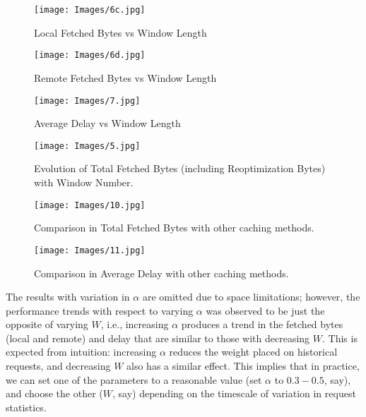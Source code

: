 \documentclass[conference]{IEEEtran}
\begin{document}
\begin{figure*}
\begin{minipage}[t]{0.32\textwidth}
  \texttt{[image: Images/6c.jpg]}
  \vspace{-0.6cm}
  \caption{Local Fetched Bytes vs Window Length}
  \label{fig:window:first}
\end{minipage}%
\hfill %
\begin{minipage}[t]{0.32\textwidth}
  \texttt{[image: Images/6d.jpg]}
  \vspace{-0.6cm}
  \caption{Remote Fetched Bytes vs Window Length}
  \label{fig:window:second}
\end{minipage}%
\hfill
\begin{minipage}[t]{0.32\textwidth}
  \texttt{[image: Images/7.jpg]}
  \vspace{-0.6cm}
  \caption{Average Delay vs Window Length}
  \label{fig:window:third}
\end{minipage}%
\vspace{-0.4cm}
\end{figure*}

\begin{figure*}
\begin{minipage}[t]{0.32\textwidth}
  \texttt{[image: Images/5.jpg]}
  \vspace{-0.6cm}
    \caption{Evolution of Total Fetched Bytes (including Reoptimization Bytes) with Window Number.}
    \label{fig:time_evolution}
\end{minipage}%
\hfill %
\begin{minipage}[t]{0.32\textwidth}
  \texttt{[image: Images/10.jpg]}
  \vspace{-0.6cm}
    \caption{Comparison in Total Fetched Bytes with other caching methods.}
    \label{fig:comp-fetched-bytes}
\end{minipage}%
\hfill
\begin{minipage}[t]{0.32\textwidth}
  \texttt{[image: Images/11.jpg]}
  \vspace{-0.6cm}
    \caption{Comparison in Average Delay with other caching methods.}
    \label{fig:comp-delay}
\end{minipage}%
\vspace{-0.4cm}
\end{figure*}


The results with variation in $\alpha$ are omitted due to space limitations; however, the performance trends with respect to varying $\alpha$ was observed to be just the opposite of varying $W$, i.e., increasing $\alpha$ produces a trend in the fetched bytes (local and remote) and delay that are similar to those with decreasing $W$. This is expected from intuition: increasing $\alpha$ reduces the weight placed on historical requests, and decreasing $W$ also has a similar effect.  This implies that in practice, we can set one of the parameters to a reasonable value (set $\alpha$ to $0.3-0.5$, say), and choose the other ($W$, say) depending on the timescale of variation in request statistics. 
\end{document}
